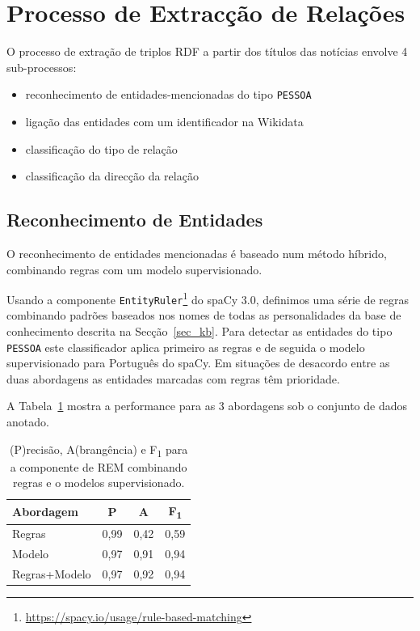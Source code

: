 \documentclass[a4paper, twocolumn, 11pt, twoside]{article}
\begin{document}
\section{Processo de Extracção de Relações}
\label{sec:classifiers}

O processo de extração de triplos RDF a partir dos títulos das notícias envolve 4 sub-processos:

\begin{itemize}
\item reconhecimento de entidades-mencionadas do tipo \texttt{PESSOA}
\item ligação das entidades com um identificador na Wikidata
\item classificação do tipo de relação
\item classificação da direcção da relação
\end{itemize}

\subsection{Reconhecimento de Entidades}
\label{subsec:ner}


O reconhecimento de entidades mencionadas é baseado num método híbrido, combinando regras com um modelo supervisionado.

Usando a componente \texttt{EntityRuler}\footnote{\url{https://spacy.io/usage/rule-based-matching}} do spaCy 3.0, definimos uma série de regras combinando padrões baseados nos nomes de todas as personalidades da base de conhecimento descrita na Secção~\ref{sec_kb}. Para detectar as entidades do tipo \texttt{PESSOA} este classificador aplica primeiro as regras e de seguida o modelo supervisionado para Português do spaCy. Em situações de desacordo entre as duas abordagens as entidades marcadas com regras têm prioridade.

A Tabela~\ref{tab:results_ner} mostra a performance para as 3 abordagens sob o conjunto de dados anotado.


\begin{table}[!h]
    \begin{center}
    \begin{tabular}{l ccc}
		{\bf Abordagem}  & {\bf P} & {\bf A} & {\bf F\textsubscript{1}} \\
        \hline
        Regras           &  0,99     &  0,42     & 		0,59		\\
        Modelo           &  0,97     &  0,91     & 		0,94		\\
		Regras+Modelo    &  0,97     &  0,92     & 		0,94		\\
    \end{tabular}
	\caption{ (P)recisão, A(brangência) e F\textsubscript{1} para a componente de REM combinando regras e o modelos supervisionado.}	
	\label{tab:results_ner}
	\end{center}
\end{table}
\end{document}
